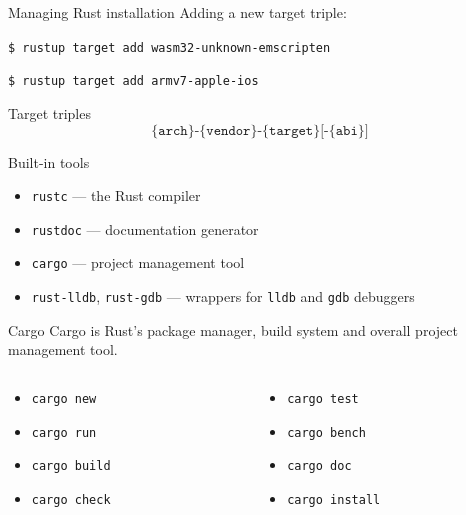 \documentclass[12pt, aspectratio=169]{beamer}
\begin{document}
\begin{frame}{Managing Rust installation}
  Adding a new target triple:

  \texttt{\$ rustup target add wasm32-unknown-emscripten}

  \texttt{\$ rustup target add armv7-apple-ios}
\end{frame}

\begin{frame}{Target triples}
  \[\texttt{\{arch\}-\{vendor\}-\{target\}[-\{abi\}]}\]
\end{frame}

\begin{frame}{Built-in tools}
  \begin{itemize}
    \item \texttt{rustc} --- the Rust compiler
    \item \texttt{rustdoc} --- documentation generator
    \item \texttt{cargo} --- project management tool
    \item \texttt{rust-lldb}, \texttt{rust-gdb} --- wrappers for \texttt{lldb}
      and \texttt{gdb} debuggers
  \end{itemize}
\end{frame}

\begin{frame}{Cargo}
  Cargo is Rust's package manager, build system and overall project management
  tool.

  \begin{columns}
    \begin{column}{0.3\textwidth}
      \begin{itemize}
        \item \texttt{cargo new}
        \item \texttt{cargo run}
        \item \texttt{cargo build}
        \item \texttt{cargo check}
      \end{itemize}
    \end{column}

    \begin{column}{0.5\textwidth}
      \begin{itemize}
        \item \texttt{cargo test}
        \item \texttt{cargo bench}
        \item \texttt{cargo doc}
        \item \texttt{cargo install}
      \end{itemize}
    \end{column}
  \end{columns}
\end{frame}
\end{document}
